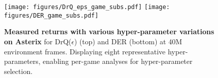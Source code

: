 \begin{figure}[!t]
    \centering
   \texttt{[image: figures/DrQ\_eps\_game\_subs.pdf]}
   \texttt{[image: figures/DER\_game\_subs.pdf]}
  
    \caption{\textbf{Measured returns with various hyper-parameter variations on Asterix} for DrQ($\epsilon$) (top) and DER (bottom) at 40M environment frames. Displaying eight representative hyper-parameters, enabling per-game analyses for hyper-parameter selection.}%
    \label{fig:per_game}%
    \vspace{-1em}
\end{figure}